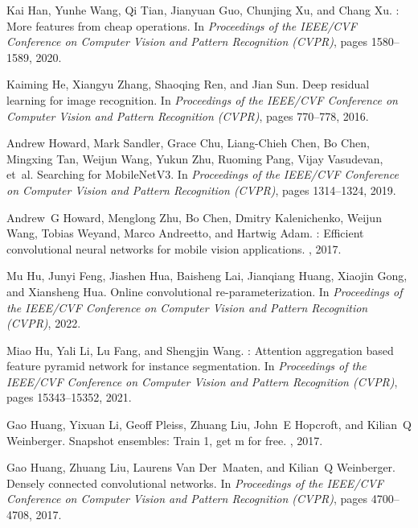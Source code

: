 \documentclass[10pt,twocolumn,letterpaper]{article}
\begin{document}
{\begin{thebibliography}{100}
				Kai Han, Yunhe Wang, Qi Tian, Jianyuan Guo, Chunjing Xu, and Chang Xu.
				: More features from cheap operations.
				\newblock In {\em Proceedings of the IEEE/CVF Conference on Computer Vision and
					Pattern Recognition (CVPR)}, pages 1580--1589, 2020.
				
				Kaiming He, Xiangyu Zhang, Shaoqing Ren, and Jian Sun.
				\newblock Deep residual learning for image recognition.
				\newblock In {\em Proceedings of the IEEE/CVF Conference on Computer Vision and
					Pattern Recognition (CVPR)}, pages 770--778, 2016.
				
				Andrew Howard, Mark Sandler, Grace Chu, Liang-Chieh Chen, Bo Chen, Mingxing
				Tan, Weijun Wang, Yukun Zhu, Ruoming Pang, Vijay Vasudevan, et~al.
				\newblock Searching for {MobileNetV3}.
				\newblock In {\em Proceedings of the IEEE/CVF Conference on Computer Vision and
					Pattern Recognition (CVPR)}, pages 1314--1324, 2019.
				
				Andrew~G Howard, Menglong Zhu, Bo Chen, Dmitry Kalenichenko, Weijun Wang,
				Tobias Weyand, Marco Andreetto, and Hartwig Adam.
				: Efficient convolutional neural networks for mobile
				vision applications.
				, 2017.
				
				Mu Hu, Junyi Feng, Jiashen Hua, Baisheng Lai, Jianqiang Huang, Xiaojin Gong,
				and Xiansheng Hua.
				\newblock Online convolutional re-parameterization.
				\newblock In {\em Proceedings of the IEEE/CVF Conference on Computer Vision and
					Pattern Recognition (CVPR)}, 2022.
				
				Miao Hu, Yali Li, Lu Fang, and Shengjin Wang.
				: Attention aggregation based feature pyramid network
				for instance segmentation.
				\newblock In {\em Proceedings of the IEEE/CVF Conference on Computer Vision and
					Pattern Recognition (CVPR)}, pages 15343--15352, 2021.
				
				Gao Huang, Yixuan Li, Geoff Pleiss, Zhuang Liu, John~E Hopcroft, and Kilian~Q
				Weinberger.
				\newblock Snapshot ensembles: Train 1, get m for free.
				,
				2017.
				
				Gao Huang, Zhuang Liu, Laurens Van Der~Maaten, and Kilian~Q Weinberger.
				\newblock Densely connected convolutional networks.
				\newblock In {\em Proceedings of the IEEE/CVF Conference on Computer Vision and
					Pattern Recognition (CVPR)}, pages 4700--4708, 2017.
				

\end{thebibliography}}
\end{document}
